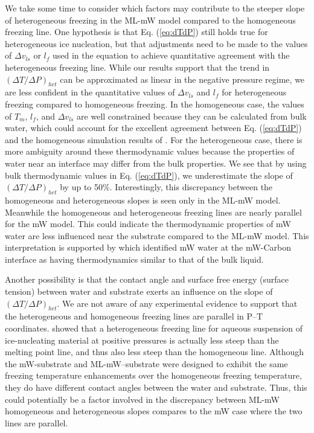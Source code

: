 \documentclass[journal abbreviation, manuscript]{copernicus}
\begin{document}
We take some time to consider which factors may contribute to the steeper slope of heterogeneous freezing in the ML-mW model compared to the homogeneous freezing line. One hypothesis is that Eq. (\ref{eq:dTdP}) still holds true for heterogeneous ice nucleation, but that adjustments need to be made to the values of $\Delta v_{ls}$ or $l_f$ used in the equation to achieve quantitative agreement with the heterogeneous freezing line. While our results support that the trend in $(\Delta T/\Delta P)_{het}$ can be approximated as linear in the negative pressure regime, we are less confident in the quantitative values of $\Delta v_{ls}$ and $l_f$ for heterogeneous freezing compared to homogeneous freezing. In the homogeneous case, the values of $T_m$, $l_f$, and $\Delta v_{ls}$ are well constrained because they can be calculated from bulk water, which could account for the excellent agreement between Eq. (\ref{eq:dTdP}) and the homogeneous simulation results of \citet{rosky2022}. For the heterogeneous case, there is more ambiguity around these thermodynamic values because the properties of water near an interface may differ from the bulk properties. We see that by using bulk thermodynamic values in Eq. (\ref{eq:dTdP}), we underestimate the slope of $(\Delta T/\Delta P)_{het}$ by up to 50\%. Interestingly, this discrepancy between the homogeneous and heterogeneous slopes is seen only in the ML-mW model. Meanwhile the homogeneous and heterogeneous freezing lines are nearly parallel for the mW model. This could indicate the thermodynamic properties of mW water are less influenced near the substrate compared to the ML-mW model. This interpretation is supported by \citet{qiu2018graphiteinterface} which identified mW water at the mW-Carbon interface as having thermodynamics similar to that of the bulk liquid.

Another possibility is that the contact angle and surface free energy (surface tension) between water and substrate exerts an influence on the slope of $(\Delta T/\Delta P)_{het}$. We are not aware of any experimental evidence to support that the heterogeneous and homogeneous freezing lines are parallel in P--T coordinates. \citet{evans1967} showed that a heterogeneous freezing line for aqueous suspension of ice-nucleating material at positive pressures is actually less steep than the melting point line, and thus also less steep than the homogeneous line. Although the mW-substrate and ML-mW--substrate were designed to exhibit the same freezing temperature enhancements over the homogeneous freezing temperature, they do have different contact angles between the water and substrate. Thus, this could potentially be a factor involved in the discrepancy between ML-mW homogeneous and heterogeneous slopes compares to the mW case where the two lines are parallel.
\end{document}
